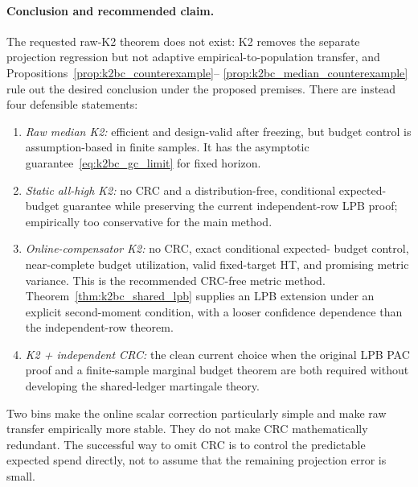\paragraph{Conclusion and recommended claim.}
The requested raw-K2 theorem does not exist: K2 removes the separate
projection regression but not adaptive empirical-to-population transfer, and
Propositions~\ref{prop:k2bc_counterexample}--
\ref{prop:k2bc_median_counterexample} rule out the desired conclusion under
the proposed premises.  There are instead four defensible statements:
\begin{enumerate}
    \item \emph{Raw median K2:} efficient and design-valid after freezing,
    but budget control is assumption-based in finite samples.  It has the
    asymptotic guarantee~\eqref{eq:k2bc_gc_limit} for fixed horizon.
    \item \emph{Static all-high K2:} no CRC and a distribution-free,
    conditional expected-budget guarantee while preserving the current
    independent-row LPB proof; empirically too conservative for the main
    method.
    \item \emph{Online-compensator K2:} no CRC, exact conditional expected-
    budget control, near-complete budget utilization, valid fixed-target HT,
    and promising metric variance.  This is the recommended CRC-free metric
    method.  Theorem~\ref{thm:k2bc_shared_lpb} supplies an LPB extension under
    an explicit second-moment condition, with a looser confidence dependence
    than the independent-row theorem.
    \item \emph{K2 + independent CRC:} the clean current choice when the
    original LPB PAC proof and a finite-sample marginal budget theorem are both
    required without developing the shared-ledger martingale theory.
\end{enumerate}
Two bins make the online scalar correction particularly simple and make raw
transfer empirically more stable.  They do not make CRC mathematically
redundant.  The successful way to omit CRC is to control the predictable
expected spend directly, not to assume that the remaining projection error is
small.
